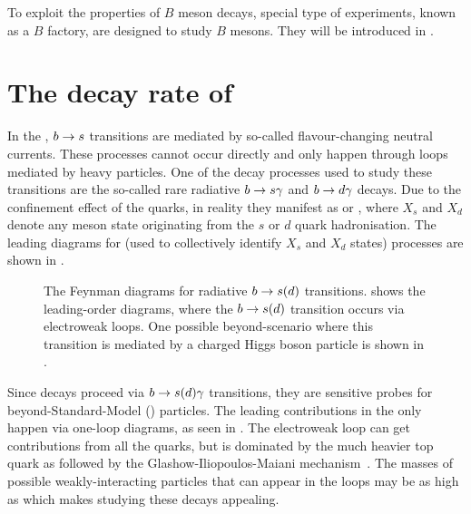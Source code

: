 To exploit the properties of $B$ meson decays, special type of experiments, known as a $B$ factory, are designed to study $B$ mesons.
They will be introduced in .

\section{The decay rate of \texorpdfstring{\BtoXsdgamma}{B->Xsg}}\label{sec:btosgamma_totalrate_theory}

In the \SM, $b\rightarrow s$ transitions are mediated by so-called flavour-changing neutral currents.
These processes cannot occur directly and only happen through loops mediated by heavy particles.
One of the decay processes used to study these transitions are the so-called rare radiative $b\rightarrow s\gamma$ and $b\rightarrow d\gamma$ decays.
Due to the confinement effect of the quarks, in reality they manifest as \BtoXsgamma or \BtoXdgamma, where $X_s$ and $X_d$ denote any meson state originating from the $s$ or $d$ quark hadronisation.
The leading \SM diagrams for \BtoXsdgamma (used to collectively identify $X_s$ and $X_d$ states) processes are shown in .

\begin{figure}[htbp!]
\resizebox{0.66\textwidth}{!}{
    \subcaptionbox{\label{fig:sm_diagrams}}{
        
        
    }
}
\resizebox{0.33\textwidth}{!}{
\subcaptionbox{\label{fig:bsm_diagrams}}{
    
}
}
\caption{\label{fig:b_to_s_gamma_diagrams}
The Feynman diagrams for radiative $b\rightarrow s(d)$ transitions. 
 shows the leading-order \SM diagrams, where the $b\rightarrow s(d)$ transition occurs via electroweak loops.
One possible beyond-\SM scenario where this transition is mediated by a charged Higgs boson particle is shown in .
}
\end{figure}

Since \BtoXsdgamma decays proceed via $b\rightarrow s(d)\gamma$ transitions, they are sensitive probes for beyond-Standard-Model (\BSM) particles. 
The leading contributions in the \SM only happen via one-loop diagrams, as seen in .
The electroweak loop can get contributions from all the quarks, but is dominated by the much heavier top quark \cite{Mannel:2001vn} as followed by the Glashow-Iliopoulos-Maiani mechanism~\cite{Glashow:1970gm}. 
The masses of possible \BSM weakly-interacting particles that can appear in the loops may be as high as  \cite{Misiak:2020vlo} which makes studying these decays appealing.

